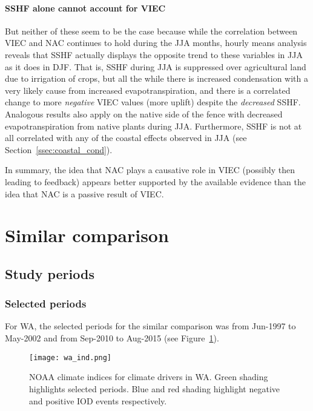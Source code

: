 \paragraph{SSHF alone cannot account for VIEC}

But neither of these seem to be the case because while the correlation between \ac{VIEC} and \ac{NAC} continues to hold during the \ac{JJA} months, hourly means analysis reveals that \ac{SSHF} actually displays the opposite trend to these variables in \ac{JJA} as it does in \ac{DJF}. That is, \ac{SSHF} during \ac{JJA} is suppressed over agricultural land due to irrigation of crops, but all the while there is increased condensation with a very likely cause from increased evapotranspiration, and there is a correlated change to more \textit{negative} \ac{VIEC} values (more uplift) despite the \textit{decreased} \ac{SSHF}. Analogous results also apply on the native side of the fence with decreased evapotranspiration from native plants during \ac{JJA}. Furthermore, \ac{SSHF} is not at all correlated with any of the coastal effects observed in \ac{JJA} (see Section~\ref{ssec:coastal_cond}).

In summary, the idea that \ac{NAC} plays a causative role in \ac{VIEC} (possibly then leading to feedback) appears better supported by the available evidence than the idea that \ac{NAC} is a passive result of \ac{VIEC}.

\section{Similar comparison}

\subsection{Study periods}

\subsubsection{Selected periods}

For \ac{WA}, the selected periods for the similar comparison was from Jun-1997 to May-2002 and from Sep-2010 to Aug-2015 (see Figure~\ref{fig:wa_ind}). 

\begin{figure}[!ht]
	\centering
	\texttt{[image: wa\_ind.png]}
	\caption[WA's relevant climate indices for similar comparison]{\ac{NOAA} climate indices for climate drivers in \ac{WA}. Green shading highlights selected periods. Blue and red shading highlight negative and positive \ac{IOD} events respectively.}
	\label{fig:wa_ind}
\end{figure}

